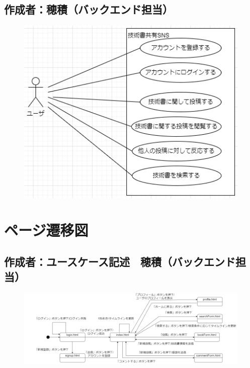 \documentclass[dvipdfmx]{jsarticle}
\begin{document}
    \subsection*{\rm{作成者：穂積（バックエンド担当）}}
        \begin{figure}[H]
            \begin{center}
                \includegraphics[scale=1.0,clip]{pictures/usecase.drawio_1.png}
            \end{center}
        \end{figure}

    \newpage
    
    \section*{ページ遷移図}
    \subsection*{\rm{作成者：ユースケース記述　穂積（バックエンド担当）}}
    \begin{figure}[H]
        \begin{center}
            \includegraphics[scale=0.5,clip]{pictures/pageSenni_1.png}
        \end{center}
    \end{figure}
\end{document}

